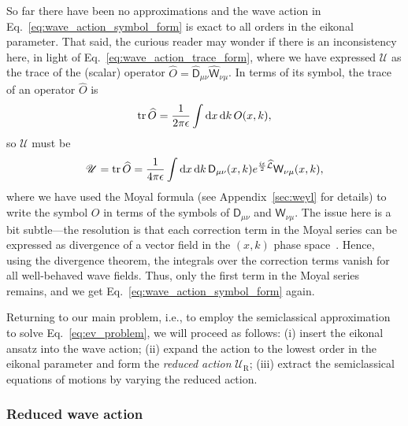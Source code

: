 So far there have been no approximations and the wave action in Eq.~\eqref{eq:wave_action_symbol_form} is exact to all orders in the eikonal parameter.
That said, the curious reader may wonder if there is an inconsistency here, in light of Eq.~\eqref{eq:wave_action_trace_form}, where we have expressed $\mathscr{U}$ as the trace of the (scalar) operator $\widehat{O} = \widehat{\mathsf{D}}_{\mu\nu}\widehat{\mathsf{W}}_{\nu\mu}$.
In terms of its symbol, the trace of an operator $\widehat{O}$ is
%
\begin{equation}
  \operatorname{tr}\widehat{O} = \frac{1}{2\pi\epsilon} \int \mathrm{d}{x}\,\mathrm{d}{k}\, O(x, k),
\end{equation}
%
so $\mathscr{U}$ must be
%
\begin{equation}
  \mathscr{U} = \operatorname{tr}{\widehat{O}} = \frac{1}{4\pi\epsilon}\int \mathrm{d}{x}\,\mathrm{d}{k}\, \mathsf{D}_{\mu\nu}(x,k)e^{\frac{i\epsilon}{2}\widehat{\mathcal{L}}}\mathsf{W}_{\nu\mu}(x, k),
\end{equation}
%
where we have used the Moyal formula (see Appendix~\ref{sec:weyl} for details) to write the symbol $O$ in terms of the symbols of $\mathsf{D}_{\mu\nu}$ and $\mathsf{W}_{\nu\mu}$.
The issue here is a bit subtle---the resolution is that each correction term in the Moyal series can be expressed as divergence of a vector field in the $(x, k)$ phase space~\cite[Problem 3.16]{tracy2014}.
Hence, using the divergence theorem, the integrals over the correction terms vanish for all well-behaved wave fields.
Thus, only the first term in the Moyal series remains, and we get Eq.~\eqref{eq:wave_action_symbol_form} again.

Returning to our main problem, i.e., to employ the semiclassical approximation to solve Eq.~\eqref{eq:ev_problem}, we will proceed as follows: (i) insert the eikonal ansatz into the wave action; (ii) expand the action to the lowest order in the eikonal parameter and form the \emph{reduced action} $\mathscr{U}_{\text{R}}$; (iii) extract the semiclassical equations of motions by varying the reduced action.

\subsubsection*{Reduced wave action}
\label{page:redaction}

